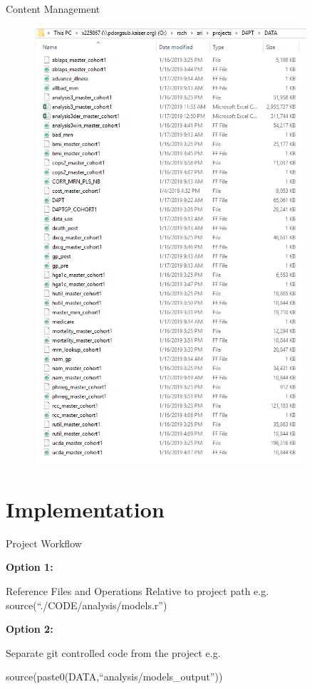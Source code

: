 \documentclass{beamer}
\begin{document}
\begin{frame}{Content Management}
\begin{minipage}{0.45\textwidth}
\begin{center}
\begin{figure}
\includegraphics[width=0.9\textwidth]{./shared_data.PNG}
\end{figure}
\end{center}
\end{minipage}

\end{frame}

\section*{Implementation}

\begin{frame}{Project Workflow}

\textbf{Option 1:}
\begin{center}
Reference Files and Operations Relative to project path e.g.\\
source(``./CODE/analysis/models.r'')
\end{center}
\bigskip

\textbf{Option 2:}
\begin{center}
Separate git controlled code from the project e.g.\\
\begin{small}
source(paste0(DATA,``analysis/models\_output''))
\end{small}
\end{center}
\bigskip

\end{frame}
\end{document}
